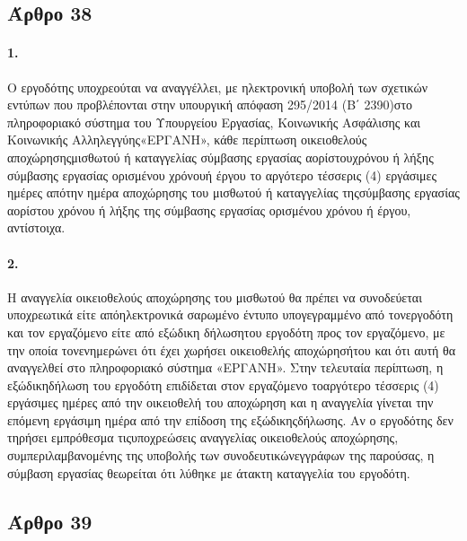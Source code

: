 \documentclass[a4paper,oneside, 10pt]{book}
\begin{document}
\subsection*{ Άρθρο 38 }
\paragraph { 1. } Ο εργοδότης υποχρεούται να αναγγέλλει, με ηλεκτρονική υποβολή των σχετικών εντύπων που προβλέπονται στην υπουργική απόφαση 295/2014 (Β΄ 2390)στο πληροφοριακό σύστημα του Υπουργείου Εργασίας, Κοινωνικής Ασφάλισης και Κοινωνικής Αλληλεγγύης«ΕΡΓΑΝΗ», κάθε περίπτωση οικειοθελούς αποχώρησηςμισθωτού ή καταγγελίας σύμβασης εργασίας αορίστουχρόνου ή λήξης σύμβασης εργασίας ορισμένου χρόνουή έργου το αργότερο τέσσερις (4) εργάσιμες ημέρες απότην ημέρα αποχώρησης του μισθωτού ή καταγγελίας τηςσύμβασης εργασίας αορίστου χρόνου ή λήξης της σύμβασης εργασίας ορισμένου χρόνου ή έργου, αντίστοιχα.
\paragraph { 2. } Η αναγγελία οικειοθελούς αποχώρησης του μισθωτού θα πρέπει να συνοδεύεται υποχρεωτικά είτε απόηλεκτρονικά σαρωμένο έντυπο υπογεγραμμένο από τονεργοδότη και τον εργαζόμενο είτε από εξώδικη δήλωσητου εργοδότη προς τον εργαζόμενο, με την οποία τονενημερώνει ότι έχει χωρήσει οικειοθελής αποχώρησήτου και ότι αυτή θα αναγγελθεί στο πληροφοριακό σύστημα «ΕΡΓΑΝΗ». Στην τελευταία περίπτωση, η εξώδικηδήλωση του εργοδότη επιδίδεται στον εργαζόμενο τοαργότερο τέσσερις (4) εργάσιμες ημέρες από την οικειοθελή του αποχώρηση και η αναγγελία γίνεται την επόμενη εργάσιμη ημέρα από την επίδοση της εξώδικηςδήλωσης. Αν ο εργοδότης δεν τηρήσει εμπρόθεσμα τιςυποχρεώσεις αναγγελίας οικειοθελούς αποχώρησης, συμπεριλαμβανομένης της υποβολής των συνοδευτικώνεγγράφων της παρούσας, η σύμβαση εργασίας θεωρείται ότι λύθηκε με άτακτη καταγγελία του εργοδότη.
\subsection*{ Άρθρο 39 }
\end{document}
